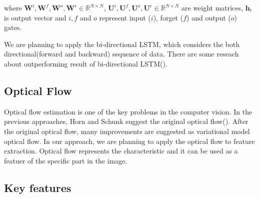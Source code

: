 where $\mathbf{W}^i, \mathbf{W}^f, \mathbf{W}^o, \mathbf{W}^c \in \mathbb{R}^{N \times N}$, $\mathbf{U}^i, \mathbf{U}^f, \mathbf{U}^o, \mathbf{U}^c \in \mathbb{R}^{N \times N}$ are weight matrices, $\mathbf h_t$ is output vector and $i, f$ and $o$ represent input ($i$), forget ($f$) and output ($o$) gates.

We are planning to apply the bi-directional LSTM, which considers the both directional(forward and backward) sequence of data. There are some reseach about outperforming result of bi-directional LSTM(\cite{BiLSTM}). 


\subsection{Optical Flow}

Optical flow estimation is one of the key problems in the computer vision. In the previous approaches, Horn and Schunk suggest the original optical flow(\cite{Horn1993}). After the original optical flow, many improvements are suggested as variational model optical flow. In our approach, we are planning to apply the optical flow to feature extraction. Optical flow represents the characteristic and it can be used as a featuer of the specific part in the image.



\subsection{Key features}
